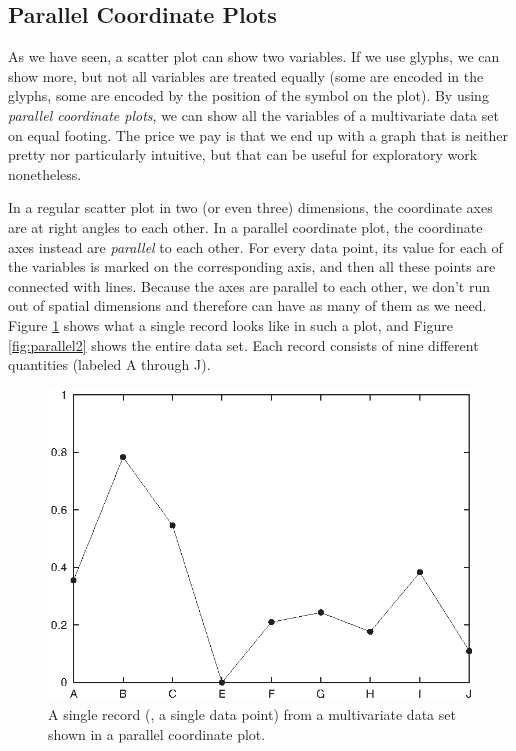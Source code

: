 \vspace*{-6pt}
\subsection{Parallel Coordinate Plots}


As we have seen, a scatter plot can show two variables. If we use
glyphs, we can show more, but not\vadjust{\pagebreak} all variables are treated equally
(some are encoded in the glyphs, some are encoded by the position of
the symbol on the plot). By using \emph{parallel coordinate plots}, we
can show all the variables of a multivariate data set on equal footing.
The price we pay is that we end up with a graph that is neither pretty
nor particularly intuitive, but that can be useful for exploratory
work nonetheless.

In a regular scatter plot in two (or even three) dimensions, the
coordinate axes are at right angles to each other. In a parallel
coordinate plot, the coordinate axes instead are \emph{parallel} to
each other. For every data point, its value for each of the variables
is marked on the corresponding axis, and then all these points are
connected with lines. Because the axes are parallel to each other, we
don't run out of spatial dimensions and therefore can have as many
of them as we need. Figure \ref{fig:parallel1} shows what a single
record looks like in such a plot, and Figure \ref{fig:parallel2} shows
the entire data set. Each record consists of nine different quantities
(labeled A through J).

\begin{figure}
   \centerline{\includegraphics{img/parallel1}}
  \caption{A single record (\ie, a single data point) from a
    multivariate data set shown in a parallel coordinate plot.}
  \label{fig:parallel1}\vspace*{-6pt}
\end{figure}


